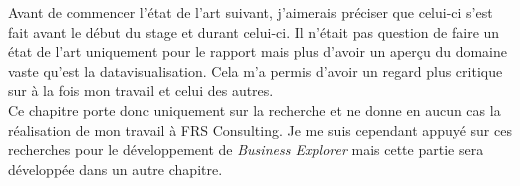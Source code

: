Avant de commencer l'état de l'art suivant, j'aimerais préciser que celui-ci s'est fait avant le début du stage et durant celui-ci. Il n'était pas question de faire un état de l'art uniquement pour le rapport mais plus d'avoir un aperçu du domaine vaste qu'est la datavisualisation. Cela m'a permis d'avoir un regard plus critique sur à la fois mon travail et celui des autres.\\

Ce chapitre porte donc uniquement sur la recherche et ne donne en aucun cas la réalisation de mon travail à FRS Consulting. Je me suis cependant appuyé sur ces recherches pour le développement de \textit{Business Explorer} mais cette partie sera développée dans un autre chapitre.